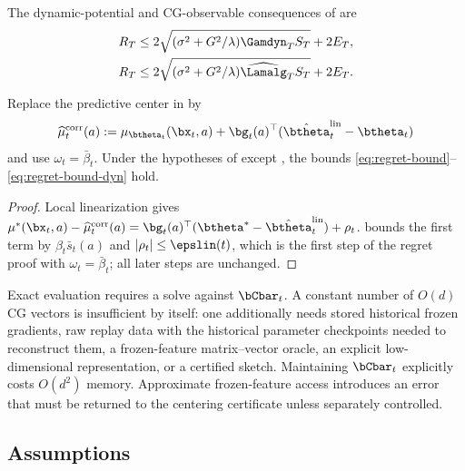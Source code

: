 The dynamic-potential and CG-observable consequences of  are
\begin{equation}\label{eq:regret-bound-dyn}
\begin{aligned}
R_T&\le2\sqrt{(\sigma^2+G^2/\lambda)\Gamdyn_T S_T}+2E_T,\\
R_T&\le2\sqrt{(\sigma^2+G^2/\lambda)\widehat{\Lamalg}_T S_T}+2E_T.
\end{aligned}
\end{equation}

\begin{corollary}\label{cor:corrected-center}
Replace the predictive center in  by
\begin{equation}\label{eq:corrected-center}
\widehat\mu_t^{\mathrm{corr}}(a):=\mu_{\btheta_t}(\bx_t,a)
+\bg_t(a)^\top(\hat\btheta_t^{\mathrm{lin}}-\btheta_t)
\end{equation}
and use $\omega_t=\bar\beta_t$.  Under the hypotheses of
 except , the bounds
\eqref{eq:regret-bound}--\eqref{eq:regret-bound-dyn} hold.
\end{corollary}
\begin{proof}
Local linearization gives
$\mu^*(\bx_t,a)-\widehat\mu_t^{\mathrm{corr}}(a)
=\bg_t(a)^\top(\btheta^*-\hat\btheta_t^{\mathrm{lin}})+\rho_t$.
 bounds the first term by
$\beta_t\bar s_t(a)$ and $|\rho_t|\le\epslin(t)$, which is the first step
of the regret proof with $\omega_t=\bar\beta_t$; all later steps are unchanged.
\end{proof}

\begin{remark}
Exact evaluation requires a solve against $\bCbar_t$.  A constant number of
$O(d)$ CG vectors is insufficient by itself: one additionally needs stored
historical frozen gradients, raw replay data with the historical parameter
checkpoints needed to reconstruct them, a frozen-feature matrix--vector oracle,
an explicit low-dimensional representation, or a certified sketch.  Maintaining
$\bCbar_t$ explicitly costs $O(d^2)$ memory.  Approximate frozen-feature access
introduces an error that must be returned to the centering certificate unless
separately controlled.
\end{remark}

\subsection{Assumptions}\label{sec:assumptions}

